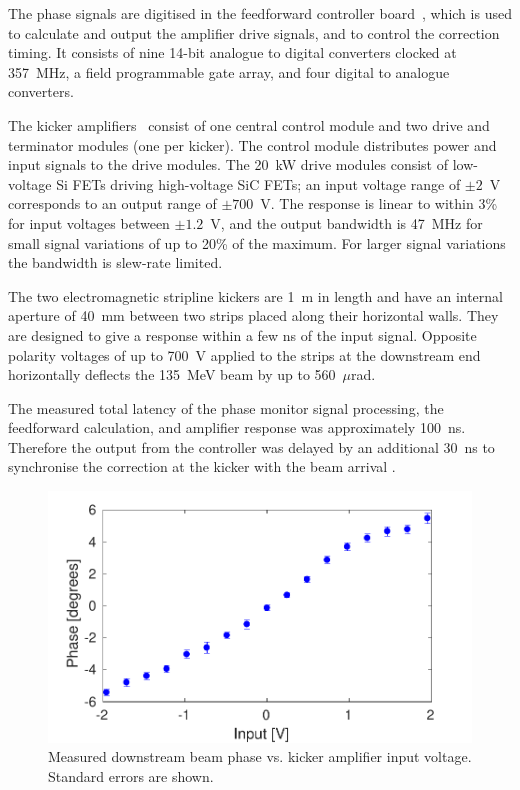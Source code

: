 \documentclass[%
 reprint,
 superscriptaddress,
 amsmath,
 amssymb,
 prl,
]{revtex4-1}
\begin{document}
The phase signals are digitised  in the feedforward controller
board~\cite{RobertsThesis}, which is used to calculate and output the amplifier 
drive signals, and to  control the correction timing. It consists of nine 
14-bit analogue to digital converters clocked at 357~MHz, a field programmable 
gate array, and four digital to analogue converters. 

The kicker amplifiers~\cite{RobertsThesis} consist of one central control 
module and two drive and terminator modules (one per kicker). The control 
module distributes power and input signals to the 
drive modules. The 20~kW drive modules consist of low-voltage Si FETs driving 
high-voltage SiC FETs; an input voltage range of \(\pm2\)~V corresponds to an 
output range of \(\pm700\)~V. The response is linear to within 3\% for input 
voltages between \(\pm1.2\)~V, and the output bandwidth is 47~MHz for small 
signal variations of up to 20\% of the maximum. For larger signal variations 
the bandwidth is slew-rate limited.

The two electromagnetic stripline kickers \cite{kickerIPAC11} are 1~m in length 
and have an internal aperture of 40~mm between two strips placed along their 
horizontal walls. They are designed to give a response within a few ns of the 
input signal.
Opposite polarity voltages of up to 700~V applied to the 
strips at the downstream end horizontally deflects the 135~MeV 
beam by up to 560~\(\mu\)rad.

The measured total latency of the phase monitor signal processing, the 
feedforward calculation, and amplifier response was approximately 100~ns. 
Therefore the output from the controller was delayed by an additional 30~ns to 
synchronise the correction at the kicker with the beam arrival 
\cite{RobertsThesis}.

\begin{figure}
	\includegraphics[width=\columnwidth]{figs/corrRange}
	\caption{\label{fig:corrRange}Measured downstream beam phase vs. kicker 
	amplifier input voltage. Standard errors are shown.}
\end{figure}
\end{document}

